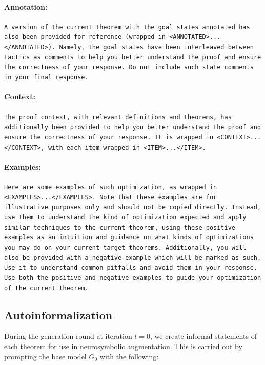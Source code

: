 \paragraph{Annotation:}

\tiny\texttt{A version of the current theorem with the goal states annotated has also been provided for reference (wrapped in <ANNOTATED>...</ANNOTATED>). Namely, the goal states have been interleaved between tactics as comments to help you better understand the proof and ensure the correctness of your response. Do not include such state comments in your final response.}


\paragraph{Context:}

\tiny\texttt{The proof context, with relevant definitions and theorems, has additionally been provided to help you better understand the proof and ensure the correctness of your response. It is wrapped in <CONTEXT>...</CONTEXT>, with each item wrapped in <ITEM>...</ITEM>.}



\paragraph{Examples:}

\tiny\texttt{Here are some examples of such optimization, as wrapped in <EXAMPLES>...</EXAMPLES>. Note that these examples are for illustrative purposes only and should not be copied directly. Instead, use them to understand the kind of optimization expected and apply similar techniques to the current theorem, using these positive examples as an intuition and guidance on what kinds of optimizations you may do on your current target theorems. Additionally, you will also be provided with a negative example which will be marked as such. Use it to understand common pitfalls and avoid them in your response. Use both the positive and negative examples to guide your optimization of the current theorem.}

\subsection{Autoinformalization}
\label{app:informal}

\normalsize During the generation round at iteration $t=0$, we create informal statements of each theorem for use in neurosymbolic augmentation. This is carried out by prompting the base model $G_0$ with the following:

